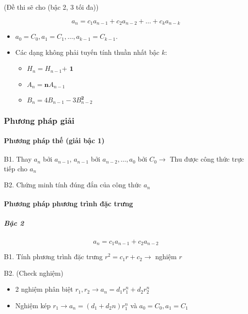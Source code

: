 \documentclass[11pt]{article}
\begin{document}
    (Đề thi sẽ cho (bậc 2, 3 tối đa))

    \[
a_n = c_1 a_{n-1} + c_2 a_{n-2} + \ldots + c_k a_{n-k}
\]

    \begin{itemize}
\item
  \(a_0=C_0, a_1 = C_1 , \ldots , a_{k-1} = C_{k-1}.\)
\item
  Các dạng không phải tuyến tính thuần nhất bậc \(k\):

  \begin{itemize}
  \item
    \(H_n = H_{n-1} \textbf{+ 1}\)
  \item
    \(A_n = \textbf{n} A_{n-1}\)
  \item
    \(B_n = 4B_{n-1} - 3 B_{n-2}^{\textbf{2}}\)
  \end{itemize}
\end{itemize}

    \subsubsection{Phương pháp giải}\label{phux1b0ux1a1ng-phuxe1p-giux1ea3i}

    \paragraph{Phương pháp thế (giải bậc
1)}\label{phux1b0ux1a1ng-phuxe1p-thux1ebf-giux1ea3i-bux1eadc-1}

    B1. Thay \(a_n\) bởi \(a_{n-1}\), \(a_{n-1}\) bởi
\(a_{n-2}, \ldots, a_0\) bởi \(C_0 \to\) Thu được công thức trực tiếp
cho \(a_n\)

B2. Chứng minh tính đúng đắn của công thức \(a_n\)

    \paragraph{Phương pháp phương trình đặc
trưng}\label{phux1b0ux1a1ng-phuxe1p-phux1b0ux1a1ng-truxecnh-ux111ux1eb7c-trux1b0ng}

    \subparagraph{Bậc 2}\label{bux1eadc-2}

\[
a_n = c_1 a_{n-1} + c_2 a_{n-2}
\]

B1. Tính phương trình đặc trưng \(r^2 = c_1 r + c_2 \to\) nghiệm \(r\)

B2. (Check nghiệm)

\begin{itemize}
\item
  2 nghiệm phân biệt \(r_1, r_2 \to a_n = d_1 r_1^n + d_2 r_2^n\)
\item
  Nghiệm kép \(r_1 \to a_n = (d_1 + d_2 n) r_1^n\) và
  \(a_0 = C_0, a_1 = C_1\)
\end{itemize}
\end{document}
